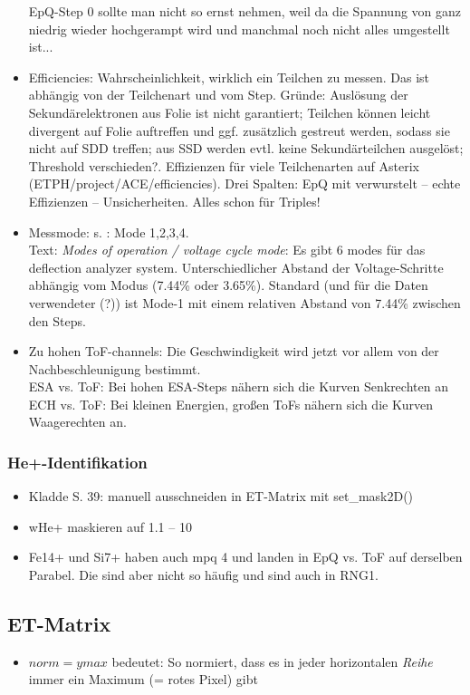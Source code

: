 \documentclass[]{article}
\begin{document}
\begin{itemize}
	EpQ-Step 0 sollte man nicht so ernst nehmen, weil da die Spannung von ganz niedrig wieder hochgerampt wird und manchmal noch nicht alles umgestellt ist...
	\item Efficiencies: Wahrscheinlichkeit, wirklich ein Teilchen zu messen. Das ist abhängig von der Teilchenart und vom Step. Gründe: Auslösung der Sekundärelektronen aus Folie ist nicht garantiert; Teilchen können leicht divergent auf Folie auftreffen und ggf. zusätzlich gestreut werden, sodass sie nicht auf SDD treffen; aus SSD werden evtl. keine Sekundärteilchen ausgelöst; Threshold verschieden?. Effizienzen für viele Teilchenarten auf Asterix (ETPH/project/ACE/efficiencies). Drei Spalten: EpQ mit verwurstelt -- echte Effizienzen -- Unsicherheiten. Alles schon für Triples!
	\item Messmode: s. \citet{gloeckler_1992}: Mode 1,2,3,4. \\ 
	Text: \textit{Modes of operation / voltage cycle mode}: Es gibt 6 modes für das deflection analyzer system. Unterschiedlicher Abstand der Voltage-Schritte abhängig vom Modus (7.44\% oder 3.65\%). Standard (und für die Daten verwendeter (?)) ist Mode-1 mit einem relativen Abstand von 7.44\% zwischen den Steps.
	\item Zu hohen ToF-channels: Die Geschwindigkeit wird jetzt vor allem von der Nachbeschleunigung bestimmt. \\
	ESA vs. ToF: Bei hohen ESA-Steps nähern sich die Kurven Senkrechten an\\
	ECH vs. ToF: Bei kleinen Energien, großen ToFs nähern sich die Kurven Waagerechten an.
\end{itemize}
%
\subsubsection{He+-Identifikation}
\begin{itemize}
	\item Kladde S. 39: manuell ausschneiden in ET-Matrix mit set\_mask2D()
	\item wHe+ maskieren auf 1.1 -- 10 
	\item Fe14+ und Si7+ haben auch mpq 4 und landen in EpQ vs. ToF auf derselben Parabel. Die sind aber nicht so häufig und sind auch in RNG1.
\end{itemize}
%
%
%
\subsection{ET-Matrix}
\begin{itemize}
	\item $norm = ymax$ bedeutet: So normiert, dass es in jeder horizontalen \textit{Reihe} immer ein Maximum (= rotes Pixel) gibt
\end{itemize}
\end{document}
